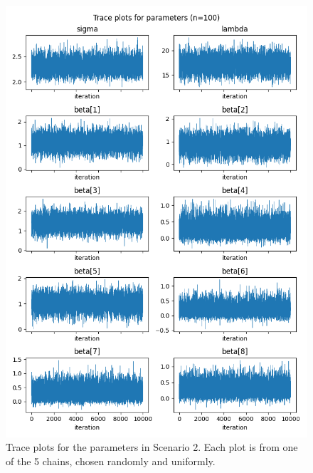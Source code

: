 \documentclass[a4paper, 10pt]{article}
\begin{document}
\begin{figure}[htb]
\begin{center}
        \includegraphics[height=.4\textheight]{../outputs/artificial_scenarios_n=100/scenario_2/traceplots.png}
    \end{center}
    \caption[Trace plots for the parameters in Scenario 2.]{Trace plots for the parameters in Scenario 2. Each plot is from one of the 5 chains, chosen randomly and uniformly.}
    \label{fig: traceplots scenario 2}
\end{figure}
\end{document}
